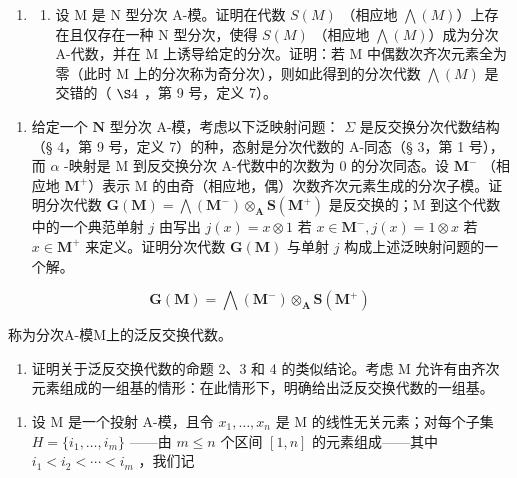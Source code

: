 \begin{enumerate}
\def\labelenumi{\arabic{enumi}.}
\setcounter{enumi}{12}
\tightlist
\item
  \begin{enumerate}
  \def\labelenumii{(\alph{enumii})}
  \tightlist
  \item
    设 M 是 N 型分次 A-模。证明在代数 \(S(M)\) （相应地 \(\bigwedge(M)\)）上存在且仅存在一种 N 型分次，使得 \(S(M)\) （相应地 \(\bigwedge(M)\)）成为分次 A-代数，并在 M 上诱导给定的分次。证明：若 M 中偶数次齐次元素全为零（此时 M 上的分次称为奇分次），则如此得到的分次代数 \(\bigwedge(M)\) 是交错的（ \(\S 4\) ，第 9 号，定义 7）。
  \end{enumerate}
\end{enumerate}

\begin{enumerate}
\def\labelenumi{(\alph{enumi})}
\setcounter{enumi}{1}
\tightlist
\item
  给定一个 \(\mathbf{N}\) 型分次 A-模，考虑以下泛映射问题： \(\Sigma\) 是反交换分次代数结构（§ 4，第 9 号，定义 7）的种，态射是分次代数的 A-同态（§ 3，第 1 号），而 \(\alpha\) -映射是 M 到反交换分次 A-代数中的次数为 0 的分次同态。设 \(\mathbf{M}^{-}\) （相应地 \(\mathbf{M}^{+}\)）表示 M 的由奇（相应地，偶）次数齐次元素生成的分次子模。证明分次代数 \(\mathbf{G}(\mathbf{M}) = \bigwedge (\mathbf{M}^{-}) \otimes_{\mathbf{A}} \mathbf{S}(\mathbf{M}^{+})\) 是反交换的；M 到这个代数中的一个典范单射 \(j\) 由写出 \(j(x) = x \otimes 1\) 若 \(x \in \mathbf{M}^{-}, j(x) = 1 \otimes x\) 若 \(x \in \mathbf{M}^{+}\) 来定义。证明分次代数 \(\mathbf{G}(\mathbf{M})\) 与单射 \(j\) 构成上述泛映射问题的一个解。
\end{enumerate}

\[
\mathbf {G} (\mathbf {M}) = \bigwedge (\mathbf {M} ^ {-}) \otimes_ {\mathbf {A}} \mathbf {S} (\mathbf {M} ^ {+})
\]

称为分次A-模M上的泛反交换代数。

\begin{enumerate}
\def\labelenumi{(\alph{enumi})}
\setcounter{enumi}{2}
\tightlist
\item
  证明关于泛反交换代数的命题 2、3 和 4 的类似结论。考虑 M 允许有由齐次元素组成的一组基的情形：在此情形下，明确给出泛反交换代数的一组基。
\end{enumerate}

\begin{enumerate}
\def\labelenumi{\arabic{enumi}.}
\setcounter{enumi}{13}
\tightlist
\item
  设 M 是一个投射 A-模，且令 \(x_{1}, \ldots, x_{n}\) 是 M 的线性无关元素；对每个子集 \(H = \{i_{1}, \ldots, i_{m}\}\) ——由 \(m \leqslant n\) 个区间 \([1, n]\) 的元素组成——其中 \(i_{1} < i_{2} < \cdots < i_{m}\) ，我们记
\end{enumerate}

